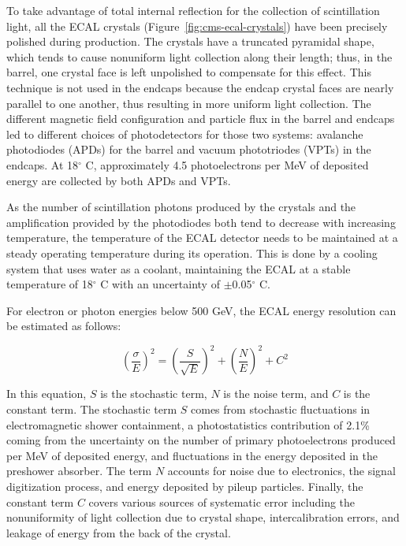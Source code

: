 To take advantage of total internal reflection for the collection of scintillation light, all the ECAL crystals (Figure~\ref{fig:cms-ecal-crystals}) have been precisely polished during production. The crystals have a truncated pyramidal shape, which tends to cause nonuniform light collection along their length; thus, in the barrel, one crystal face is left unpolished to compensate for this effect. This technique is not used in the endcaps because the endcap crystal faces are nearly parallel to one another, thus resulting in more uniform light collection. The different magnetic field configuration and particle flux in the barrel and endcaps led to different choices of photodetectors for those two systems: avalanche photodiodes (APDs) for the barrel and vacuum phototriodes (VPTs) in the endcaps. At 18$^{\circ}$ C, approximately 4.5 photoelectrons per MeV of deposited energy are collected by both APDs and VPTs. 

As the number of scintillation photons produced by the crystals and the amplification provided by the photodiodes both tend to decrease with increasing temperature, the temperature of the ECAL detector needs to be maintained at a steady operating temperature during its operation. This is done by a cooling system that uses water as a coolant, maintaining the ECAL at a stable temperature of 18$^{\circ}$ C with an uncertainty of $\pm$0.05$^{\circ}$ C.

For electron or photon energies below 500 GeV, the ECAL energy resolution can be estimated as follows:

\begin{equation}
(\frac{\sigma}{E})^2 = (\frac{S}{\sqrt{E}})^2 + (\frac{N}{E})^2 + C^2
\label{eq:ECAL-resolution}
\end{equation}

In this equation, $S$ is the stochastic term, $N$ is the noise term, and $C$ is the constant term. The stochastic term $S$ comes from stochastic fluctuations in electromagnetic shower containment, a photostatistics contribution of 2.1\% coming from the uncertainty on the number of primary photoelectrons produced per MeV of deposited energy, and fluctuations in the energy deposited in the preshower absorber. The term $N$ accounts for noise due to electronics, the signal digitization process, and energy deposited by pileup particles. Finally, the constant term $C$ covers various sources of systematic error including the nonuniformity of light collection due to crystal shape, intercalibration errors, and leakage of energy from the back of the crystal.

